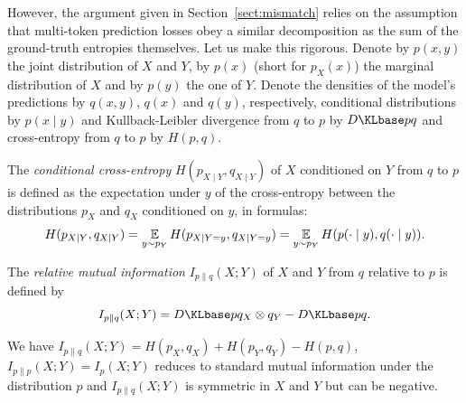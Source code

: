 However, the argument given in Section~\ref{sect:mismatch} relies on the assumption that multi-token prediction losses obey a similar decomposition as the sum of the ground-truth entropies themselves. Let us make this rigorous. Denote by $p(x, y)$ the joint distribution of $X$ and $Y$, by $p(x)$ (short for $p_X(x)$) the marginal distribution of $X$ and by $p(y)$ the one of $Y$. Denote the densities of the model's predictions by $q(x, y)$, $q(x)$ and $q(y)$, respectively, conditional distributions by $p(x \mid y)$ and Kullback-Leibler divergence from $q$ to $p$ by $\KL{p}{q}$ and cross-entropy from $q$ to $p$ by $H(p, q)$.
\begin{definition}
    The \emph{conditional cross-entropy} $H(p_{X \mid Y}, q_{X \mid Y})$ of $X$ conditioned on $Y$ from $q$ to $p$ is defined as the expectation under $y$ of the cross-entropy between the distributions $p_X$ and $q_X$ conditioned on $y$, in formulas:
    \[
    H(p_{X \mid Y}, q_{X \mid Y})
    = \operatorname*{\mathbb{E}}_{y \sim p_Y} H(p_{X \mid Y=y}, q_{X \mid Y=y})
    = \operatorname*{\mathbb{E}}_{y \sim p_Y} H(p(\cdot \mid y), q(\cdot \mid y)).
    \]
\end{definition}
\begin{definition}
    The \emph{relative mutual information} $I_{p \| q}(X; Y)$ of $X$ and $Y$ from $q$ relative to $p$ is defined by
    \[
    I_{p \| q}(X; Y)
    = \KL{p}{q_X \otimes q_Y} - \KL{p}{q}.
    \]
\end{definition}
We have $I_{p \| q}(X; Y) = H(p_X, q_X) + H(p_Y, q_Y) - H(p, q)$, $I_{p \| p}(X; Y) = I_p(X; Y)$ reduces to standard mutual information under the distribution $p$ and $I_{p \| q}(X; Y)$ is symmetric in $X$ and $Y$ but can be negative.

